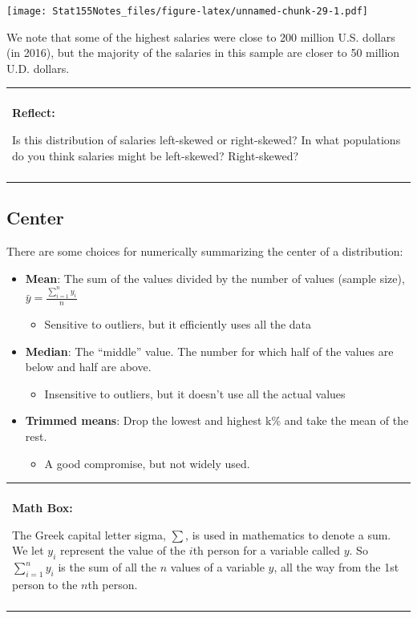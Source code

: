 \documentclass[]{book}
\providecommand{\tightlist}{%
  \setlength{\itemsep}{0pt}\setlength{\parskip}{0pt}}
\newenvironment{reflect}
{
    \begin{center}
    
    \begin{tabular}{|p{0.8\textwidth}|}
    \rowcolor{LightBlue}
    \hline\\
    \rowcolor{LightBlue}
    \textbf{Reflect:}
}
{
    \\\rowcolor{LightBlue}
    \\\hline
    \end{tabular} 
    \end{center}
}
\newenvironment{mathbox}
{
    \begin{center}
    
    \begin{tabular}{|p{0.8\textwidth}|}
    \rowcolor{LightYellow}
    \hline\\
    \rowcolor{LightYellow}
    \textbf{Math Box:}
}
{
    \\\rowcolor{LightYellow}
    \\\hline
    \end{tabular} 
    \end{center}
}
\begin{document}
\texttt{[image: Stat155Notes\_files/figure-latex/unnamed-chunk-29-1.pdf]}

We note that some of the highest salaries were close to 200 million U.S. dollars (in 2016), but the majority of the salaries in this sample are closer to 50 million U.D. dollars.

\begin{reflect}
Is this distribution of salaries left-skewed or right-skewed? In what
populations do you think salaries might be left-skewed? Right-skewed?
\end{reflect}

\hypertarget{center}{%
\subsection{Center}\label{center}}

There are some choices for numerically summarizing the center of a distribution:

\begin{itemize}
\tightlist
\item
  \textbf{Mean}: The sum of the values divided by the number of values (sample size), \(\bar{y} = \frac{\sum^n_{i=1}y_i}{n}\)

  \begin{itemize}
  \tightlist
  \item
    Sensitive to outliers, but it efficiently uses all the data
  \end{itemize}
\item
  \textbf{Median}: The ``middle'' value. The number for which half of the values are below and half are above.

  \begin{itemize}
  \tightlist
  \item
    Insensitive to outliers, but it doesn't use all the actual values
  \end{itemize}
\item
  \textbf{Trimmed means}: Drop the lowest and highest k\% and take the mean of the rest.

  \begin{itemize}
  \tightlist
  \item
    A good compromise, but not widely used.
  \end{itemize}
\end{itemize}

\begin{mathbox}
The Greek capital letter sigma, \(\sum\), is used in mathematics to
denote a sum. We let \(y_i\) represent the value of the \(i\)th person
for a variable called \(y\). So \(\sum^n_{i=1}y_i\) is the sum of all
the \(n\) values of a variable \(y\), all the way from the 1st person to
the \(n\)th person.
\end{mathbox}
\end{document}
